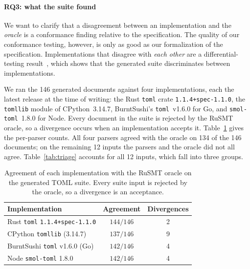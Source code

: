 \documentclass[sigconf,screen]{acmart}
\theoremstyle{definition}
\theoremstyle{remark}
\newcommand{\rusmt}{RuSMT}
\newcommand{\toml}{TOML}
\newcommand{\code}[1]{\texttt{#1}}
\newcommand{\certcount}{146}    %
\newcommand{\allagree}{134}     %
\newcommand{\divmarkers}{12}   %
\newcommand{\agreerust}{144}\newcommand{\divrust}{2}
\newcommand{\agreepy}{137}\newcommand{\divpy}{9}
\newcommand{\agreego}{142}\newcommand{\divgo}{4}
\newcommand{\agreenode}{142}\newcommand{\divnode}{4}
\begin{document}
\paragraph{RQ3: what the suite found}

We want to clarify that a disagreement between an implementation and the \emph{oracle} is a conformance finding relative to the specification. The quality of our conformance testing, however, is only as good as our formalization of the specification. Implementations that disagree with \emph{each other} are a differential-testing result~\cite{mckeeman1998differential}, which shows that the generated suite discriminates between implementations.

We ran the \certcount{} generated documents against four implementations, each
the latest release at the time of writing: the Rust \code{toml} crate
\code{1.1.4+spec-1.1.0}, the \code{tomllib} module of CPython~3.14.7,
BurntSushi's \code{toml}~v1.6.0 for Go, and \code{smol-toml}~1.8.0 for Node.
Every document in the suite is rejected by the \rusmt{} oracle, so a divergence occurs when an implementation accepts it. Table~\ref{tab:diff} gives the
per-parser counts. All four parsers agreed with the oracle on \allagree{} of the
\certcount{} documents; on the remaining \divmarkers{} inputs the parsers and
the oracle did not all agree. Table~\ref{tab:triage} accounts for all \divmarkers{} inputs,
which fall into three groups.

\begin{table}[t]
\centering
\caption{Agreement of each implementation with the \rusmt{} oracle on the
generated \toml{} suite. Every suite input is rejected by the oracle, so a
divergence is an acceptance.}
\label{tab:diff}
\scriptsize
\setlength{\tabcolsep}{4pt}
\begin{tabular}{@{}lcc@{}}
\toprule
Implementation & Agreement & Divergences \\
\midrule
Rust \code{toml} \code{1.1.4+spec-1.1.0} & $\agreerust/\certcount$ & \divrust{} \\
CPython \code{tomllib} (3.14.7) & $\agreepy/\certcount$ & \divpy{} \\
BurntSushi \code{toml} v1.6.0 (Go) & $\agreego/\certcount$ & \divgo{} \\
Node \code{smol-toml} 1.8.0 & $\agreenode/\certcount$ & \divnode{} \\
\bottomrule
\end{tabular}
\end{table}
\end{document}
